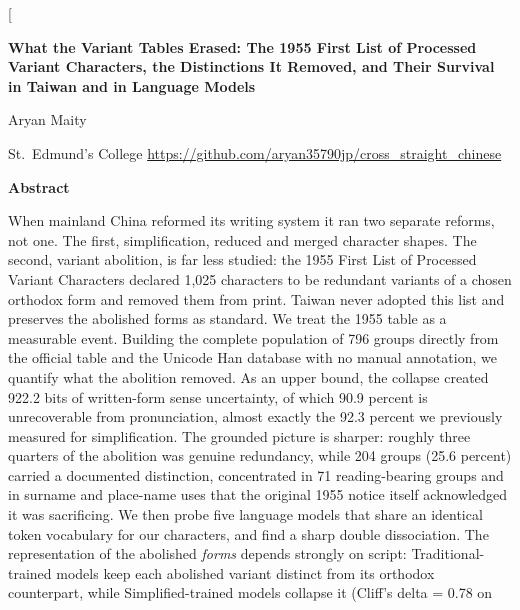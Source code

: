 \documentclass[10pt,twocolumn]{article}
\begin{document}
\twocolumn[{%
  \vspace*{0.2em}
  \begin{center}
    {\large\bfseries What the Variant Tables Erased: The 1955 First List of
    Processed Variant Characters, the Distinctions It Removed, and Their
    Survival in Taiwan and in Language Models\par}
    \vspace{0.7em}
    {\normalsize Aryan Maity\par}
    \vspace{0.2em}
    {\small St.~Edmund's College \quad\textbar\quad
     \url{https://github.com/aryan35790jp/cross_straight_chinese}\par}
  \end{center}
  \vspace{1.0em}
  \begin{center}
  \begin{minipage}{0.86\textwidth}
  \begin{center}\textbf{Abstract}\end{center}
  \small\noindent
When mainland China reformed its writing system it ran two separate reforms, not
one. The first, simplification, reduced and merged character shapes. The second,
variant abolition, is far less studied: the 1955 First List of Processed Variant
Characters declared 1,025 characters to be redundant variants of a chosen
orthodox form and removed them from print. Taiwan never adopted this list and
preserves the abolished forms as standard. We treat the 1955 table as a
measurable event. Building the complete population of 796 groups directly from
the official table and the Unicode Han database with no manual annotation, we
quantify what the abolition removed. As an upper bound, the collapse created
922.2 bits of written-form sense uncertainty, of which 90.9 percent is
unrecoverable from pronunciation, almost exactly the 92.3 percent we previously
measured for simplification. The grounded picture is sharper: roughly three
quarters of the abolition was genuine redundancy, while 204 groups (25.6 percent)
carried a documented distinction, concentrated in 71 reading-bearing groups and
in surname and place-name uses that the original 1955 notice itself acknowledged
it was sacrificing. We then probe five language models that share an identical
token vocabulary for our characters, and find a sharp double dissociation. The
representation of the abolished \emph{forms} depends strongly on script:
Traditional-trained models keep each abolished variant distinct from its orthodox
counterpart, while Simplified-trained models collapse it (Cliff's delta = 0.78 on

\end{minipage}
\end{center}}
\end{document}
